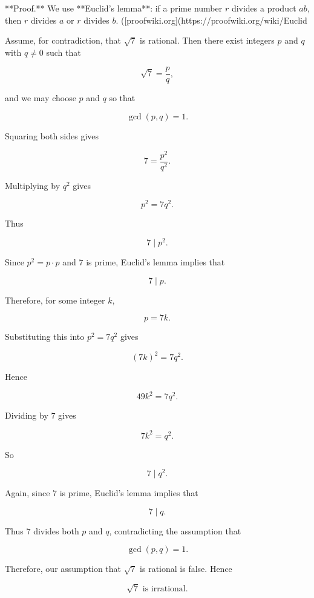 **Proof.** We use **Euclid’s lemma**: if a prime number $r$ divides a product $ab$, then $r$ divides $a$ or $r$ divides $b$. ([proofwiki.org](https://proofwiki.org/wiki/Euclid%

Assume, for contradiction, that $\sqrt{7}$ is rational. Then there exist integers $p$ and $q$ with $q \neq 0$ such that

\[
\sqrt{7}=\frac{p}{q},
\]

and we may choose $p$ and $q$ so that

\[
\gcd(p,q)=1.
\]

Squaring both sides gives

\[
7=\frac{p^2}{q^2}.
\]

Multiplying by $q^2$ gives

\[
p^2=7q^2.
\]

Thus

\[
7 \mid p^2.
\]

Since $p^2=p\cdot p$ and $7$ is prime, Euclid’s lemma implies that

\[
7 \mid p.
\]

Therefore, for some integer $k$,

\[
p=7k.
\]

Substituting this into $p^2=7q^2$ gives

\[
(7k)^2=7q^2.
\]

Hence

\[
49k^2=7q^2.
\]

Dividing by $7$ gives

\[
7k^2=q^2.
\]

So

\[
7 \mid q^2.
\]

Again, since $7$ is prime, Euclid’s lemma implies that

\[
7 \mid q.
\]

Thus $7$ divides both $p$ and $q$, contradicting the assumption that

\[
\gcd(p,q)=1.
\]

Therefore, our assumption that $\sqrt{7}$ is rational is false. Hence

\[
\boxed{\sqrt{7}\text{ is irrational}.}
\]